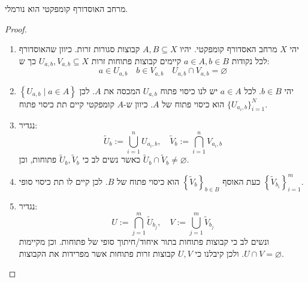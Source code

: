 \documentclass{tstextbook}
\begin{document}
\begin{proposition}
מרחב האוסדורף קומפקטי הוא נורמלי.

\end{proposition}
\begin{proof}
  \begin{enumerate}
    \item יהי \(X\) מרחב האסדורף קומפקטי. יהיו \(A,B\subseteq X\) קבוצות סגורות זרות. כיוון שהאוסדורף לכל נקודות \(a\in A,b \in B\) קיימים קבוצות פתוחות זרות \(U_{a,b},V_{a,b}\subseteq X\) כך ש: 
$$a\in U_{a,b}\quad b\in V_{a,b}\quad U_{a,b}\cap V_{a,b}=\varnothing $$


    \item יהי \(b \in B\). לכל \(a \in A\) יש לנו כיסוי פתוח \(U_{a,b}\) המכסה את \(A\). לכן \(\left\{  U_{a,b}\mid a \in A  \right\}\) הוא כיסוי פתוח של \(A\). כיוון ש-\(A\) קומפקטי קיים תת כיסוי פתוח \(\{ U_{a_{i},b} \}_{i=1}^{N}\).  


    \item נגדיר: 
$$\tilde{U}_{b}:=\bigcup_{i=1}^{n}U_{a_{i},b},\quad\tilde{V}_{b}:=\bigcap_{i=1}^{n}V_{a_{i},b}$$
כאשר נשים לב כי \(\tilde{U}_{b},\tilde{V}_{b}\) פתוחות, וכן \(\tilde{U}_{b}\cap \tilde{V}_{b}\neq \varnothing\).


    \item כעת האוסף \(\left\{  \tilde{V}_{b}  \right\}_{b \in B}\) הוא כיסוי פתוח של \(B\). לכן קיים לו תת כיסוי סופי \(\left\{  \tilde{V}_{b_{i}}  \right\}_{i=1}^{m}\). 


    \item נגדיר: 
$$U:=\bigcap_{j=1}^{m}\tilde{U}_{b_{j}},\quad V:=\bigcup_{j=1}^{m}\tilde{V}_{b_{j}}$$
ונשים לב כי קבוצות פתוחות בתור איחוד/חיתוך סופי של פתוחות. וכן מקיימות \(U\cap V=\varnothing\). ולכן קיבלנו כי \(U,V\) קבוצות זרות פתוחות אשר מפרידות את הקבוצות.


  \end{enumerate}
\end{proof}
\end{document}
